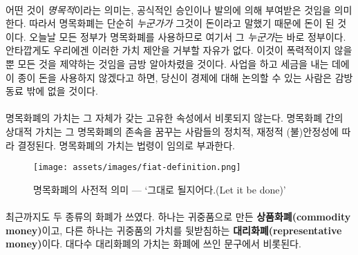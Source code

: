 \paragraph{}
어떤 것이 \textit{명목적}이라는 의미는, 공식적인 승인이나 발의에 의해 부여받은 것임을 의미한다. 
따라서 명목화폐는 단순히 \textit{누군가가} 그것이 돈이라고 말했기 때문에 돈이 된 것이다. 
오늘날 모든 정부가 명목화폐를 사용하므로 여기서 그 \textit{누군가}는 바로 정부이다. 
안타깝게도 우리에겐 이러한 가치 제안을 거부할 자유가 없다.
이것이 폭력적이지 않을 뿐 모든 것을 제약하는 것임을 금방 알아차렸을 것이다.
사업을 하고 세금을 내는 데에 이 종이 돈을 사용하지 않겠다고 하면,
당신이 경제에 대해 논의할 수 있는 사람은 감방 동료 밖에 없을 것이다.

\begin{comment}
	The value of fiat money does not stem from its inherent properties. How
	good a certain type of fiat money is, is only correlated to the
	political and fiscal (in)stability of those who dream it into existence.
	Its value is imposed by decree, arbitrarily.
\end{comment}

\paragraph{}
명목화폐의 가치는 그 자체가 갖는 고유한 속성에서 비롯되지 않는다.
명목화폐 간의 상대적 가치는 그 명목화폐의 존속을 꿈꾸는 사람들의 정치적, 재정적 (불)안정성에 따라 결정된다.
명목화폐의 가치는 법령이 임의로 부과한다.

\begin{figure}
	\centering
	\texttt{[image: assets/images/fiat-definition.png]}
	\caption{명목화폐의 사전적 의미 --- `그대로 될지어다.(Let it be done)'}
	\label{fig:fiat-definition}
\end{figure}

\paragraph{}
최근까지도 두 종류의 화폐가 쓰였다.
하나는 귀중품으로 만든 \textbf{상품화폐(commodity money)}이고, 
다른 하나는 귀중품의 가치를 뒷받침하는 \textbf{대리화폐(representative money)}이다.
대다수 대리화폐의 가치는 화폐에 쓰인 문구에서 비롯된다.

